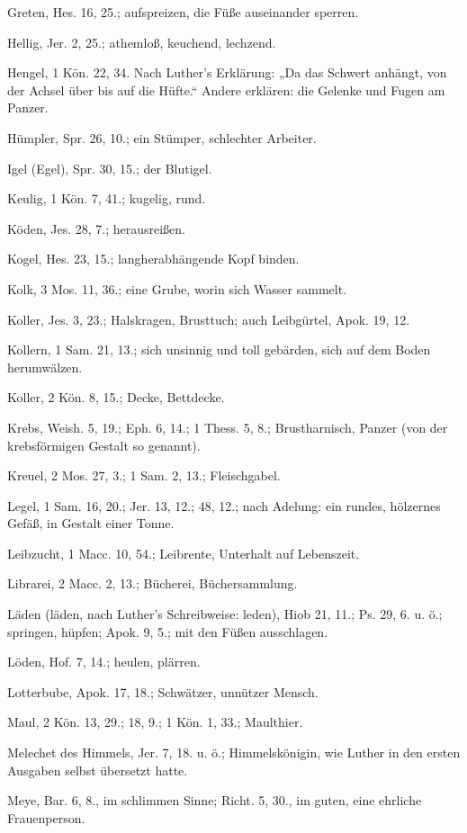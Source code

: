 Greten, Hes. 16, 25.; aufspreizen, die Füße auseinander sperren.

Hellig, Jer. 2, 25.; athemloß, keuchend, lechzend.

Hengel, 1 Kön. 22, 34. Nach Luther's Erklärung: „Da das Schwert anhängt, von der Achsel über bis auf die Hüfte.“ Andere erklären: die Gelenke und Fugen am Panzer.

Hümpler, Spr. 26, 10.; ein Stümper, schlechter Arbeiter.

Igel (Egel), Spr. 30, 15.; der Blutigel.

Keulig, 1 Kön. 7, 41.; kugelig, rund.

Köden, Jes. 28, 7.; herausreißen.

Kogel, Hes. 23, 15.; langherabhängende Kopf binden.

Kolk, 3 Mos. 11, 36.; eine Grube, worin sich Wasser sammelt.

Koller, Jes. 3, 23.; Halskragen, Brusttuch; auch Leibgürtel, Apok. 19, 12.

Kollern, 1 Sam. 21, 13.; sich unsinnig und toll gebärden, sich auf dem Boden herumwälzen.

Koller, 2 Kön. 8, 15.; Decke, Bettdecke.

Krebs, Weish. 5, 19.; Eph. 6, 14.; 1 Thess. 5, 8.; Brustharnisch, Panzer (von der krebsförmigen Gestalt so genannt).

Kreuel, 2 Mos. 27, 3.; 1 Sam. 2, 13.; Fleischgabel.

Legel, 1 Sam. 16, 20.; Jer. 13, 12.; 48, 12.; nach Adelung: ein rundes, hölzernes Gefäß, in Gestalt einer Tonne.

Leibzucht, 1 Macc. 10, 54.; Leibrente, Unterhalt auf Lebenszeit.

Librarei, 2 Macc. 2, 13.; Bücherei, Büchersammlung.

Läden (läden, nach Luther's Schreibweise: leden), Hiob 21, 11.; Ps. 29, 6. u. ö.; springen, hüpfen; Apok. 9, 5.; mit den Füßen ausschlagen.

Löden, Hof. 7, 14.; heulen, plärren.

Lotterbube, Apok. 17, 18.; Schwätzer, unnützer Mensch.

Maul, 2 Kön. 13, 29.; 18, 9.; 1 Kön. 1, 33.; Maulthier.

Melechet des Himmels, Jer. 7, 18. u. ö.; Himmelskönigin, wie Luther in den ersten Ausgaben selbst übersetzt hatte.

Meye, Bar. 6, 8., im schlimmen Sinne; Richt. 5, 30., im guten, eine ehrliche Frauenperson.

